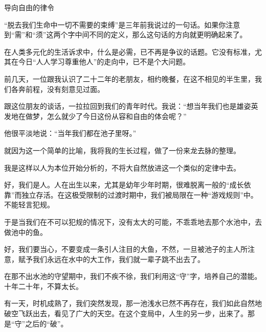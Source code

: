 \begin{center}
    \par 导向自由的律令  
\end{center}
\par {}
\par “脱去我们生命中一切不需要的束缚”是三年前我说过的一句话。如果你注意到“需”和“须”这两个字中间不同的定义，那么这句话的方向就更明确起来了。
\par 在人类多元化的生活诉求中，什么是必需，已不再是争议的话题。它没有标准，尤其在今日“人人学习尊重他人”的走向中，已不是个大问题。
\par 前几天，一位跟我认识了二十二年的老朋友，相约晚餐，在这不相见的半生里，我们各奔前程，没有刻意见过面。
\par 跟这位朋友的谈话，一拉拉回到我们的青年时代。我说：“想当年我们也是雄姿英发地在做梦，怎么就少了今日这份从容和自由的体会呢？”
\par 他很平淡地说：“当年我们都在池子里呀。”
\par 就因为这一个简单的比喻，我将我的生长过程，做了一份来龙去脉的整理。
\par 我是这样以人为本位开始分析的，不将大自然放进这一个类似的定律中去。
\par 好，我们是人。人在出生以来，尤其是幼年少年时期，很难脱离一般的“成长依靠”而独立存活。在这极受限制的过渡时期中，我们被局限在一种“游戏规则”中。不能轻言犯规。
\par 于是当我们在不可以犯规的情况下，没有太大的可能，不乖乖地去那个水池中，去做池中的鱼。
\par 好，我们要当心，不要变成一条引人注目的大鱼，不然，一旦被池子的主人所注意，赋予我们永远在水中的大工作，我们就一辈子跳不出去了。
\par 在那不出水池的守望期中，我们不疾不徐，我们利用这“守”字，培养自己的潜能。十年二十年，不算太长。
\par 有一天，时机成熟了，我们突然发现，那一池浅水已然不再存在，我们如此自然地破空飞跃出去，看见了广大的天空。在这个变局中，人生的另一步，出来了。那是“守”之后的“破”。
